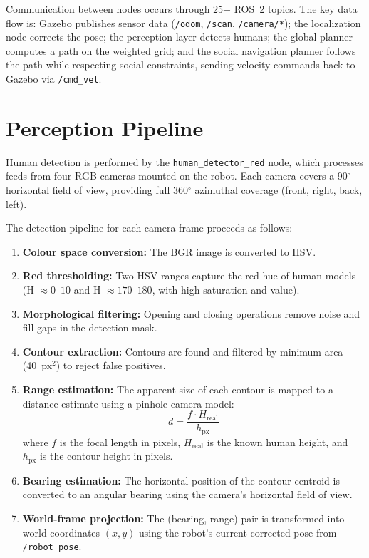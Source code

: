\documentclass[a4paper]{article}
\begin{document}
Communication between nodes occurs through 25+ ROS~2 topics. The key data flow is: Gazebo publishes sensor data (\texttt{/odom}, \texttt{/scan}, \texttt{/camera/*}); the localization node corrects the pose; the perception layer detects humans; the global planner computes a path on the weighted grid; and the social navigation planner follows the path while respecting social constraints, sending velocity commands back to Gazebo via \texttt{/cmd\_vel}.


\section{Perception Pipeline}

Human detection is performed by the \texttt{human\_detector\_red} node, which processes feeds from four RGB cameras mounted on the robot. Each camera covers a 90$^\circ$ horizontal field of view, providing full 360$^\circ$ azimuthal coverage (front, right, back, left).

The detection pipeline for each camera frame proceeds as follows:

\begin{enumerate}
    \item \textbf{Colour space conversion:} The BGR image is converted to HSV.
    \item \textbf{Red thresholding:} Two HSV ranges capture the red hue of human models (H $\approx 0$--$10$ and H $\approx 170$--$180$, with high saturation and value).
    \item \textbf{Morphological filtering:} Opening and closing operations remove noise and fill gaps in the detection mask.
    \item \textbf{Contour extraction:} Contours are found and filtered by minimum area (40~px$^2$) to reject false positives.
    \item \textbf{Range estimation:} The apparent size of each contour is mapped to a distance estimate using a pinhole camera model:
    \begin{equation}
        d = \frac{f \cdot H_{\text{real}}}{h_{\text{px}}}
    \end{equation}
    where $f$ is the focal length in pixels, $H_{\text{real}}$ is the known human height, and $h_{\text{px}}$ is the contour height in pixels.
    \item \textbf{Bearing estimation:} The horizontal position of the contour centroid is converted to an angular bearing using the camera's horizontal field of view.
    \item \textbf{World-frame projection:} The (bearing, range) pair is transformed into world coordinates $(x, y)$ using the robot's current corrected pose from \texttt{/robot\_pose}.
\end{enumerate}
\end{document}
